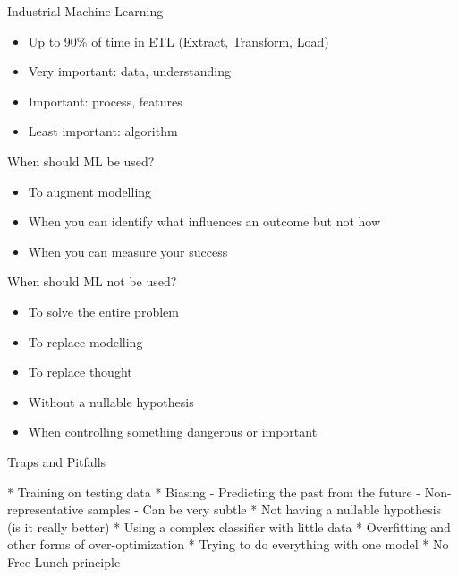 \documentclass{beamer}
\begin{document}
\begin{frame}{Industrial Machine Learning}

\begin{itemize}
  \item Up to 90\% of time in ETL (Extract, Transform, Load)
  \item Very important: data, understanding
  \item Important: process, features
  \item Least important: algorithm
\end{itemize}

\end{frame}

\begin{frame}{When should ML be used?}
  \begin{itemize}
  \item To augment modelling
  \item When you can identify \alert{what} influences an outcome but not \alert{how}
  \item When you can measure your success
  \end{itemize}
\end{frame}

\begin{frame}{When should ML \alert{not} be used?}
  \begin{itemize}
  \item To solve the entire problem
  \item To replace modelling
  \item To replace thought
  \item Without a \alert{nullable} hypothesis
  \item When controlling something dangerous or important
  \end{itemize}

\end{frame}

\begin{frame}{Traps and Pitfalls}

* Training on testing data
* Biasing
  - Predicting the past from the future
  - Non-representative samples
  - Can be very subtle
* Not having a nullable hypothesis (is it really better)
* Using a complex classifier with little data
* Overfitting and other forms of over-optimization
* Trying to do everything with one model
* No Free Lunch principle

\end{frame}
\end{document}
